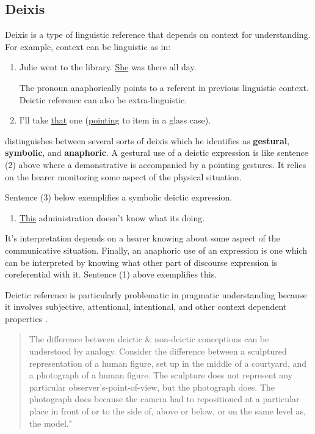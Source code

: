 \subsection{Deixis}
\label{deixis}

Deixis is a type of linguistic reference that depends on context for understanding. For example, context can be linguistic as in:

\begin{enumerate}
\item Julie went to the library. \underline{She} was there all day.

The pronoun anaphorically points to a referent in previous linguistic context. Deictic reference can also be extra-linguistic.

\item I'll take \underline{that} one (\underline{pointing} to item in a glass case).
\end{enumerate}
\citep{SantaCruzlectures:1971te} distinguishes between several sorts of deixis which he identifies as \textbf{gestural}, \textbf{symbolic}, and \textbf{anaphoric}. A gestural use of a deictic expression is like sentence (2) above where a demonstrative is accompanied by a pointing gestures. It relies on the hearer monitoring some aspect of the physical situation.
 
Sentence (3) below exemplifies a symbolic deictic expression.
\begin{enumerate}[resume]
\item \underline{This} administration doesn't know what its doing.
\end{enumerate}

It's interpretation depends on a hearer knowing about some aspect of the communicative situation. Finally, an anaphoric use of an expression is one which can be interpreted by knowing what other part of discourse expression is coreferential with it. Sentence (1) above exemplifies this.

Deictic reference is particularly problematic in pragmatic understanding because it involves subjective, attentional, intentional, and other context dependent properties  \citep{Levinson:1983ww}. 

\begin{quote}
The difference between deictic \& non-deictic conceptions can be understood by analogy. Consider the difference between a sculptured representation of a human figure, set up in the middle of a courtyard, and a photograph of a human figure. The sculpture does not represent any particular observer's-point-of-view, but the photograph does. The photograph does because the camera had to repositioned at a particular place in front of or to the side of, above or below, or on the same level as, the model." \citep[p. 235]{SantaCruzlectures:1971te}
\end{quote}


